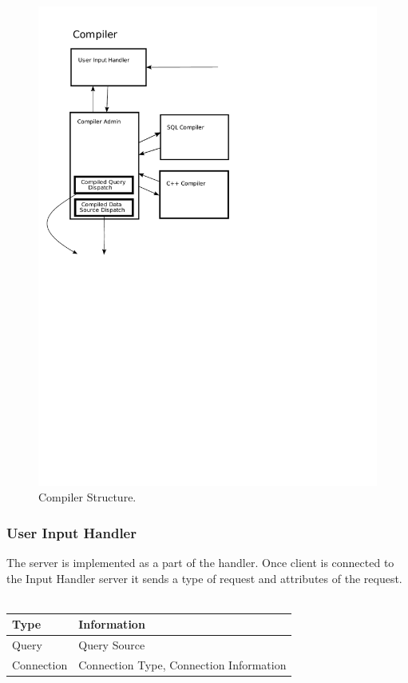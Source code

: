 \documentclass[11pt]{article}
\begin{document}
\begin{figure}
  \includegraphics[width=4.50in]{compiler.pdf}
  \caption{Compiler Structure.}
  \label{CompilerPicture}
\end{figure}

\subsubsection{User Input Handler}
The server is implemented as a part of the handler. Once client is connected to the Input Handler server it sends a type of request and attributes of the request.
\\
\\
\begin{tabular}{|l|l|}
  \hline
  Type & Information \\ \hline
  Query & Query Source \\ \hline
  Connection & Connection Type, Connection Information \\ \hline
\end{tabular}
\\
\end{document}
